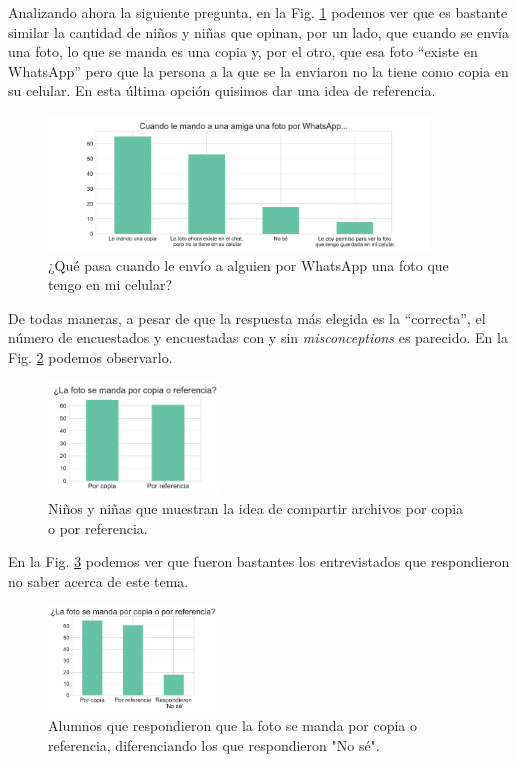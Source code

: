 Analizando ahora la siguiente pregunta, en la Fig. \ref{fig:analisis12} podemos ver que es bastante similar la cantidad de niños y niñas que opinan, por un lado, que cuando se envía una foto, lo que se manda es una copia y, por el otro, que esa foto ``existe en WhatsApp'' pero que la persona a la que se la enviaron no la tiene como copia en su celular. En esta última opción quisimos dar una idea de referencia.

\begin{figure}[h]
    \centering
    \includegraphics[width=0.9\textwidth]{images_analisis/12.pdf}
    \caption{ ¿Qué pasa cuando le envío a alguien por WhatsApp una foto que tengo en mi celular?}
    \label{fig:analisis12}
\end{figure}

De todas maneras, a pesar de que la respuesta más elegida es la ``correcta'', el número de encuestados y encuestadas con y sin \textit{misconceptions} es parecido. En la Fig. \ref{fig:analisis13} podemos observarlo.

\begin{figure}[h]
    \centering
    \includegraphics[width=0.4\textwidth]{images_analisis/13.pdf}
    \caption{Niños y niñas que muestran la idea de compartir archivos por copia o por referencia.}
    \label{fig:analisis13}
\end{figure}

\newpage

En la Fig. \ref{fig:analisis15} podemos ver que fueron bastantes los entrevistados que respondieron no saber acerca de este tema. 

\begin{figure}[h]
    \centering
    \includegraphics[width=0.4\textwidth]{images_analisis/15.pdf} 
    \caption{Alumnos que respondieron que la foto se manda por copia o referencia, diferenciando los que respondieron "No sé".}
    \label{fig:analisis15}
\end{figure}

